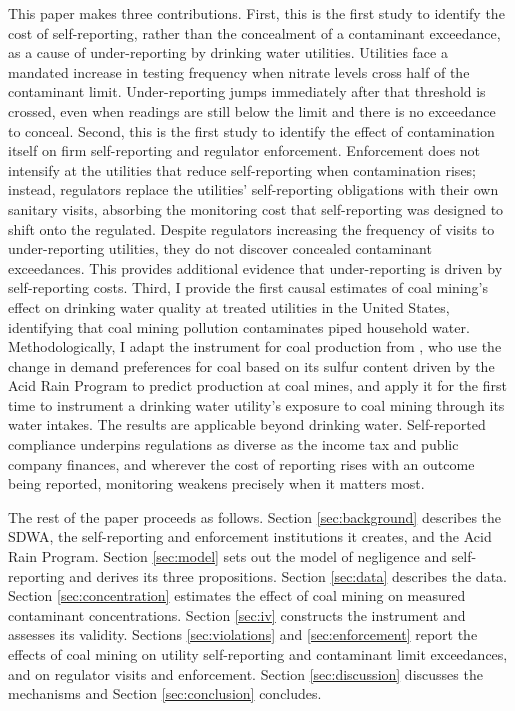 \documentclass[12pt]{article}
\begin{document}
This paper makes three contributions. First, this is the first study to identify the cost of self-reporting, rather than the concealment of a contaminant exceedance, as a cause of under-reporting by drinking water utilities. Utilities face a mandated increase in testing frequency when nitrate levels cross half of the contaminant limit. Under-reporting jumps immediately after that threshold is crossed, even when readings are still below the limit and there is no exceedance to conceal. Second, this is the first study to identify the effect of contamination itself on firm self-reporting and regulator enforcement. Enforcement does not intensify at the utilities that reduce self-reporting when contamination rises; instead, regulators replace the utilities' self-reporting obligations with their own sanitary visits, absorbing the monitoring cost that self-reporting was designed to shift onto the regulated. Despite regulators increasing the frequency of visits to under-reporting utilities, they do not discover concealed contaminant exceedances. This provides additional evidence that under-reporting is driven by self-reporting costs. Third, I provide the first causal estimates of coal mining's effect on drinking water quality at treated utilities in the United States, identifying that coal mining pollution contaminates piped household water. Methodologically, I adapt the instrument for coal production from \textcite{stratford2015coalprod}, who use the change in demand preferences for coal based on its sulfur content driven by the Acid Rain Program to predict production at coal mines, and apply it for the first time to instrument a drinking water utility's exposure to coal mining through its water intakes. The results are applicable beyond drinking water. Self-reported compliance underpins regulations as diverse as the income tax and public company finances, and wherever the cost of reporting rises with an outcome being reported, monitoring weakens precisely when it matters most.

The rest of the paper proceeds as follows. Section \ref{sec:background} describes the SDWA, the self-reporting and enforcement institutions it creates, and the Acid Rain Program. Section \ref{sec:model} sets out the model of negligence and self-reporting and derives its three propositions. Section \ref{sec:data} describes the data. Section \ref{sec:concentration} estimates the effect of coal mining on measured contaminant concentrations. Section \ref{sec:iv} constructs the instrument and assesses its validity. Sections \ref{sec:violations} and \ref{sec:enforcement} report the effects of coal mining on utility self-reporting and contaminant limit exceedances, and on regulator visits and enforcement. Section \ref{sec:discussion} discusses the mechanisms and Section \ref{sec:conclusion} concludes.
\end{document}
